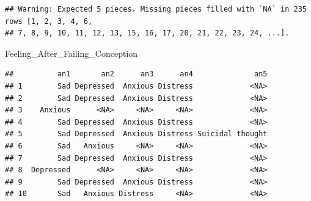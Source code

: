 \documentclass[
]{article}
\newenvironment{Shaded}{\begin{snugshade}}{\end{snugshade}}
\newcommand{\NormalTok}[1]{#1}
\begin{document}
\begin{verbatim}
## Warning: Expected 5 pieces. Missing pieces filled with `NA` in 235 rows [1, 2, 3, 4, 6,
## 7, 8, 9, 10, 11, 12, 13, 15, 16, 17, 20, 21, 22, 23, 24, ...].
\end{verbatim}

\begin{Shaded}
\begin{Highlighting}[]
\NormalTok{Feeling\_After\_Failing\_Conception}
\end{Highlighting}
\end{Shaded}

\begin{verbatim}
##          an1       an2      an3      an4              an5
## 1        Sad Depressed  Anxious Distress             <NA>
## 2        Sad Depressed  Anxious Distress             <NA>
## 3    Anxious      <NA>     <NA>     <NA>             <NA>
## 4        Sad Depressed  Anxious Distress             <NA>
## 5        Sad Depressed  Anxious Distress Suicidal thought
## 6        Sad   Anxious     <NA>     <NA>             <NA>
## 7        Sad Depressed  Anxious Distress             <NA>
## 8  Depressed      <NA>     <NA>     <NA>             <NA>
## 9        Sad Depressed  Anxious Distress             <NA>
## 10       Sad   Anxious Distress     <NA>             <NA>
\end{verbatim}
\end{document}
